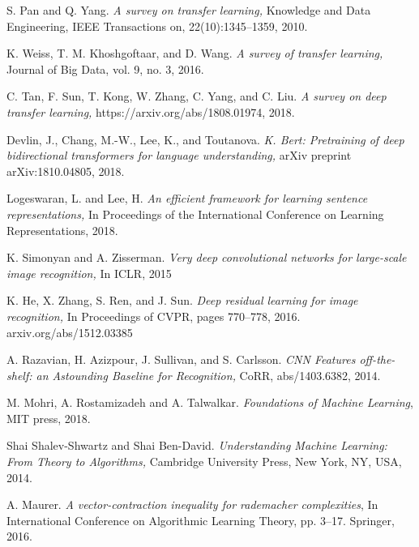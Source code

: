 \documentclass[12pt]{article}
\begin{document}
\pagebreak
\medskip
\begin{thebibliography}{9}
{} 

S. Pan and Q. Yang.
\textit{A survey on transfer learning,}  Knowledge and Data Engineering, IEEE Transactions on,
22(10):1345–1359, 2010.

K. Weiss, T. M. Khoshgoftaar, and D. Wang. \textit{ A survey of transfer learning,} 
Journal of Big Data, vol. 9, no. 3, 2016.

C. Tan, F. Sun, T. Kong, W. Zhang, C. Yang, and C. Liu.
\textit{A survey on deep transfer learning,}  https://arxiv.org/abs/1808.01974, 2018.



Devlin, J., Chang, M.-W., Lee, K., and Toutanova. \textit{K. Bert: Pretraining of deep bidirectional transformers for language understanding,} arXiv preprint arXiv:1810.04805, 2018.


Logeswaran, L. and Lee, H. \textit{An efficient framework for
learning sentence representations,}  In Proceedings of the
International Conference on Learning Representations,
2018.


K. Simonyan and A. Zisserman. \textit{ Very deep convolutional networks
for large-scale image recognition,} In ICLR, 2015

K. He, X. Zhang, S. Ren, and J. Sun. \textit{Deep
residual learning for image recognition,} In
Proceedings of CVPR, pages 770–778, 2016.
arxiv.org/abs/1512.03385

A. Razavian, H. Azizpour, J. Sullivan, and S. Carlsson. \textit{ CNN Features off-the-shelf: an Astounding Baseline
for Recognition,} CoRR, abs/1403.6382, 2014.

M.  Mohri, A. Rostamizadeh and A. Talwalkar.  \textit{Foundations of Machine Learning}, MIT press, 2018.

Shai Shalev-Shwartz and Shai Ben-David. \textit{Understanding Machine Learning: From Theory to Algorithms,} Cambridge University Press, New York, NY, USA, 2014.

A. Maurer. \textit{A vector-contraction inequality for rademacher
complexities}, In International Conference on Algorithmic Learning Theory, pp. 3–17. Springer, 2016.

\end{thebibliography}
\end{document}
